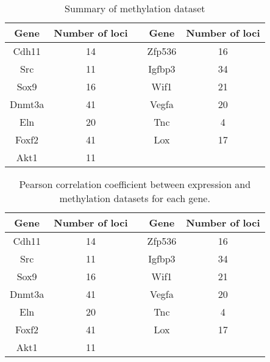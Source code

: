 \documentclass[10pt]{article}
\begin{document}
\begin{table}[ht]
\centering
\begin{tabular}{|c|c|c|c|c|}
\hline
Gene & Number of loci  & & Gene & Number of loci  \\
\hline
Cdh11 & 14 & & Zfp536 & 16 \\
\hline
Src & 11 & & Igfbp3 & 34 \\
\hline
Sox9 & 16 & & Wif1 & 21 \\
\hline
Dnmt3a & 41 & & Vegfa & 20 \\
\hline
Eln & 20 & & Tnc & 4 \\
\hline
Foxf2 & 41 & & Lox & 17 \\
\hline
Akt1 & 11 & & &  \\
\hline
\end{tabular}
\caption{Summary of methylation dataset}
\label{tab:sup1}
\end{table}

\begin{table}
\centering
\begin{tabular}{|c|c|c|c|c|}
\hline
Gene & Number of loci  & & Gene & Number of loci  \\
\hline
Cdh11 & 14 & & Zfp536 & 16 \\
\hline
Src & 11 & & Igfbp3 & 34 \\
\hline
Sox9 & 16 & & Wif1 & 21 \\
\hline
Dnmt3a & 41 & & Vegfa & 20 \\
\hline
Eln & 20 & & Tnc & 4 \\
\hline
Foxf2 & 41 & & Lox & 17 \\
\hline
Akt1 & 11 & & &  \\
\hline
\end{tabular}
\caption{Pearson correlation coefficient between expression and
  methylation datasets for each gene.}
\label{tab:sup2}
\end{table}
\end{document}
